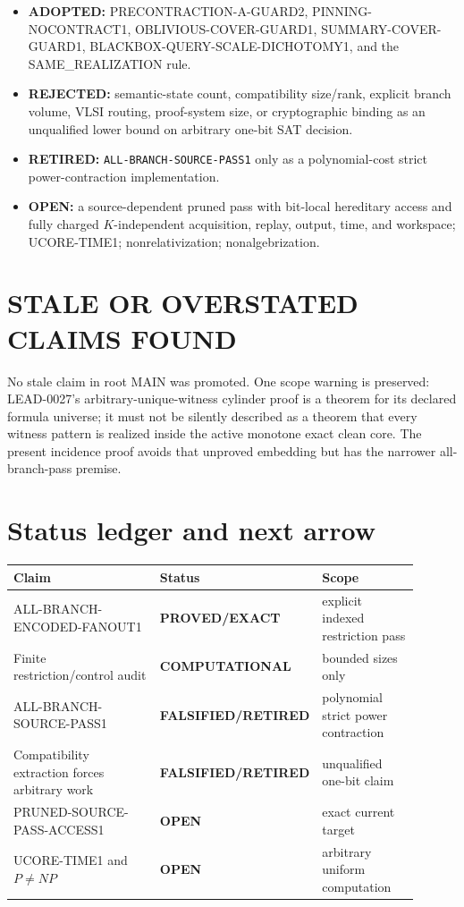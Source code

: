 \documentclass[11pt]{article}
\newcommand{\OPEN}{\textbf{OPEN}}
\newcommand{\EXACT}{\textbf{PROVED/EXACT}}
\newcommand{\COMP}{\textbf{COMPUTATIONAL}}
\newcommand{\RETIRED}{\textbf{FALSIFIED/RETIRED}}
\begin{document}
\begin{itemize}[leftmargin=1.5em]
\item \textbf{ADOPTED:} PRECONTRACTION-A-GUARD2,
  PINNING-NOCONTRACT1, OBLIVIOUS-COVER-GUARD1,
  SUMMARY-COVER-GUARD1, BLACKBOX-QUERY-SCALE-DICHOTOMY1, and the
  SAME\_REALIZATION rule.
\item \textbf{REJECTED:} semantic-state count, compatibility size/rank,
  explicit branch volume, VLSI routing, proof-system size, or cryptographic
  binding as an unqualified lower bound on arbitrary one-bit SAT decision.
\item \textbf{RETIRED:} \texttt{ALL-BRANCH-SOURCE-PASS1} only as a
  polynomial-cost strict power-contraction implementation.
\item \textbf{OPEN:} a source-dependent pruned pass with bit-local hereditary
  access and fully charged $K$-independent acquisition, replay, output, time,
  and workspace; UCORE-TIME1; nonrelativization; nonalgebrization.
\end{itemize}

\section{STALE OR OVERSTATED CLAIMS FOUND}

No stale claim in root MAIN was promoted.  One scope warning is preserved:
LEAD-0027's arbitrary-unique-witness cylinder proof is a theorem for its
declared formula universe; it must not be silently described as a theorem
that every witness pattern is realized inside the active monotone exact
clean core.  The present incidence proof avoids that unproved embedding but
has the narrower all-branch-pass premise.

\section{Status ledger and next arrow}

\begin{center}\small
\begin{tabular}{p{0.43\linewidth}p{0.20\linewidth}p{0.27\linewidth}}
\toprule
Claim & Status & Scope\\
\midrule
ALL-BRANCH-ENCODED-FANOUT1 & \EXACT & explicit indexed restriction pass\\
Finite restriction/control audit & \COMP & bounded sizes only\\
ALL-BRANCH-SOURCE-PASS1 & \RETIRED & polynomial strict power contraction\\
Compatibility extraction forces arbitrary work & \RETIRED & unqualified one-bit claim\\
PRUNED-SOURCE-PASS-ACCESS1 & \OPEN & exact current target\\
UCORE-TIME1 and $P\ne NP$ & \OPEN & arbitrary uniform computation\\
\bottomrule
\end{tabular}
\end{center}
\end{document}
